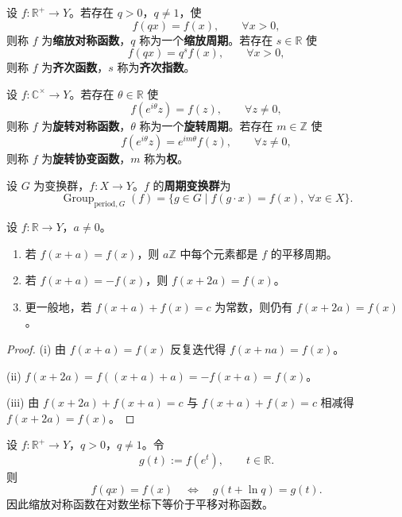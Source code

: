 \begin{definition}[缩放对称函数与齐次函数]\label{def:scaling_symmetric_function}
设 $f:\mathbb{R}^+\to Y$。若存在 $q>0$，$q\neq 1$，使
\[
f(qx)=f(x),\qquad \forall x>0,
\]
则称 $f$ 为\textbf{缩放对称函数}，$q$ 称为一个\textbf{缩放周期}。若存在 $s\in\mathbb{R}$ 使
\[
f(qx)=q^s f(x),\qquad \forall x>0,
\]
则称 $f$ 为\textbf{齐次函数}，$s$ 称为\textbf{齐次指数}。
\end{definition}

\begin{definition}[旋转对称函数与旋转协变函数]\label{def:rotation_symmetric_function}
设 $f:\mathbb{C}^\times\to Y$。若存在 $\theta\in\mathbb{R}$ 使
\[
f(e^{i\theta}z)=f(z),\qquad \forall z\neq 0,
\]
则称 $f$ 为\textbf{旋转对称函数}，$\theta$ 称为一个\textbf{旋转周期}。若存在 $m\in\mathbb{Z}$ 使
\[
f(e^{i\theta}z)=e^{im\theta}f(z),\qquad \forall z\neq 0,
\]
则称 $f$ 为\textbf{旋转协变函数}，$m$ 称为\textbf{权}。
\end{definition}

\begin{definition}[周期变换群]\label{def:period_group}
设 $G$ 为变换群，$f:X\to Y$。$f$ 的\textbf{周期变换群}为
\[
\operatorname{Group}_{\mathrm{period},G}(f)
=\{g\in G\mid f(g\cdot x)=f(x),\ \forall x\in X\}.
\]
\end{definition}

\begin{proposition}[平移对称与反周期]\label{prop:translation_antiperiod}
设 $f:\mathbb{R}\to Y$，$a\neq 0$。
\begin{enumerate}[label=(\roman*)]
    \item 若 $f(x+a)=f(x)$，则 $a\mathbb{Z}$ 中每个元素都是 $f$ 的平移周期。
    \item 若 $f(x+a)=-f(x)$，则 $f(x+2a)=f(x)$。
    \item 更一般地，若 $f(x+a)+f(x)=c$ 为常数，则仍有 $f(x+2a)=f(x)$。
\end{enumerate}
\end{proposition}

\begin{proof}
(i) 由 $f(x+a)=f(x)$ 反复迭代得 $f(x+na)=f(x)$。

(ii) $f(x+2a)=f((x+a)+a)=-f(x+a)=f(x)$。

(iii) 由 $f(x+2a)+f(x+a)=c$ 与 $f(x+a)+f(x)=c$ 相减得 $f(x+2a)=f(x)$。
\end{proof}

\begin{proposition}[缩放对称与对数平移]\label{prop:scaling_log_translation}
设 $f:\mathbb{R}^+\to Y$，$q>0$，$q\neq 1$。令
\[
g(t):=f(e^t),\qquad t\in\mathbb{R}.
\]
则
\[
f(qx)=f(x)\quad\Longleftrightarrow\quad g(t+\ln q)=g(t).
\]
因此缩放对称函数在对数坐标下等价于平移对称函数。
\end{proposition}

